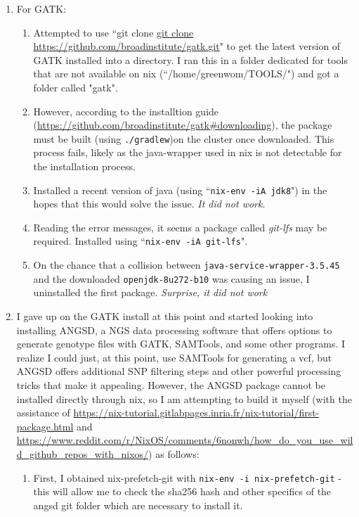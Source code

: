 \documentclass[12pt]{report}
\begin{document}
\begin{enumerate}
  \item For GATK:
  \begin{enumerate}
    \item Attempted to use ``git clone \url{git clone https://github.com/broadinstitute/gatk.git}" to get the latest version of GATK installed into a directory. I ran this in a folder dedicated for tools that are not available on nix (``/home/greenwom/TOOLS/") and got a folder called "gatk".
    \item However, according to the installtion guide (\url{https://github.com/broadinstitute/gatk#downloading}), the package must be built (using \verb!./gradlew!)on the cluster once downloaded. This process fails, likely as the java-wrapper used in nix is not detectable for the installation process.
    \item Installed a recent version of java (using ``\verb!nix-env -iA jdk8!") in the hopes that this would solve the issue. \emph{It did not work}.
    \item Reading the error messages, it seems a package called \emph{git-lfs} may be required. Installed using ``\verb!nix-env -iA git-lfs!".
    \item On the chance that a collision between \verb!java-service-wrapper-3.5.45! and  the downloaded \verb!openjdk-8u272-b10! was causing an issue, I uninstalled the first package. \emph{Surprise, it did not work}
  \end{enumerate}
  \item I gave up on the GATK install at this point and started looking into installing ANGSD, a NGS data processing software that offers options to generate genotype files with GATK, SAMTools, and some other programs. I realize I could just, at this point, use SAMTools for generating a vcf, but ANGSD offers additional SNP filtering steps and other powerful processing tricks that make it appealing. However, the ANGSD package cannot be installed directly through nix, so I am attempting to build it myself (with the assistance of \url{https://nix-tutorial.gitlabpages.inria.fr/nix-tutorial/first-package.html} and \url{https://www.reddit.com/r/NixOS/comments/6nonwh/how_do_you_use_wild_github_repos_with_nixos/}) as follows:
  \begin{enumerate}
    \item First, I obtained nix-prefetch-git with \verb!nix-env -i nix-prefetch-git! - this will allow me to check the sha256 hash and other specifics of the angsd git folder which are necessary to install it.

\end{enumerate}
\end{enumerate}
\end{document}
